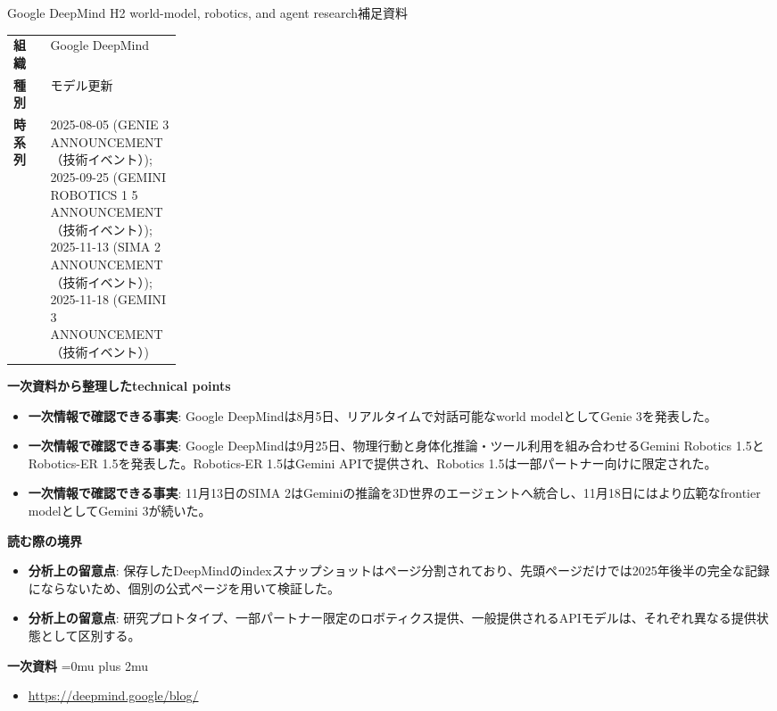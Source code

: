 \begin{technicalnote}{Google DeepMind H2 world-model, robotics, and agent research}{補足資料}
\begingroup
\begin{tabularx}{\linewidth}{@{}>{\bfseries}p{0.22\linewidth}X@{}}
組織 & Google DeepMind \\
種別 & モデル更新 \\
時系列 & 2025-08-05 (GENIE 3 ANNOUNCEMENT（技術イベント）); 2025-09-25 (GEMINI ROBOTICS 1 5 ANNOUNCEMENT（技術イベント）); 2025-11-13 (SIMA 2 ANNOUNCEMENT（技術イベント）); 2025-11-18 (GEMINI 3 ANNOUNCEMENT（技術イベント）) \\
\end{tabularx}
\smallskip
{\bfseries 一次資料から整理したtechnical points}
\begin{itemize}[leftmargin=1.5em,itemsep=0.35em]
\item \textbf{一次情報で確認できる事実}: Google DeepMindは8月5日、リアルタイムで対話可能なworld modelとしてGenie 3を発表した。
\item \textbf{一次情報で確認できる事実}: Google DeepMindは9月25日、物理行動と身体化推論・ツール利用を組み合わせるGemini Robotics 1.5とRobotics-ER 1.5を発表した。Robotics-ER 1.5はGemini APIで提供され、Robotics 1.5は一部パートナー向けに限定された。
\item \textbf{一次情報で確認できる事実}: 11月13日のSIMA 2はGeminiの推論を3D世界のエージェントへ統合し、11月18日にはより広範なfrontier modelとしてGemini 3が続いた。
\end{itemize}
\begin{minipage}{\linewidth}
{\bfseries 読む際の境界}
\begin{itemize}[leftmargin=1.5em,itemsep=0.35em]
\item \textbf{分析上の留意点}: 保存したDeepMindのindexスナップショットはページ分割されており、先頭ページだけでは2025年後半の完全な記録にならないため、個別の公式ページを用いて検証した。
\item \textbf{分析上の留意点}: 研究プロトタイプ、一部パートナー限定のロボティクス提供、一般提供されるAPIモデルは、それぞれ異なる提供状態として区別する。
\end{itemize}
\begin{samepage}
{\bfseries 一次資料}
\begingroup\sloppy
\Urlmuskip=0mu plus 2mu\relax
\begin{itemize}[leftmargin=1.5em,itemsep=0.25em]
\item {\scriptsize\url{https://deepmind.google/blog/}}
\end{itemize}
\endgroup
\end{samepage}
\end{minipage}
\endgroup
\end{technicalnote}
\medskip

